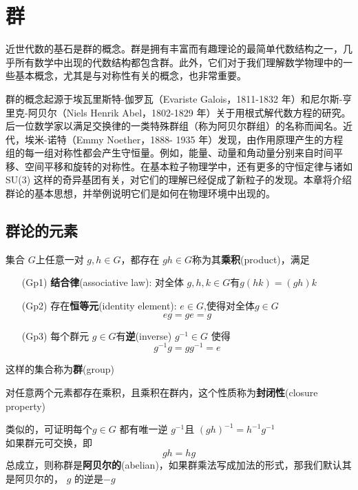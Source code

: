 \chapter{群}
近世代数的基石是群的概念。群是拥有丰富而有趣理论的最简单代数结构之一，几乎所有数学中出现的代数结构都包含群。此外，它们对于我们理解数学物理中的一些基本概念，尤其是与对称性有关的概念，也非常重要。

群的概念起源于埃瓦里斯特-伽罗瓦（Evariste Galois，1811-1832 年）和尼尔斯-亨里克-阿贝尔（Niels Henrik Abel，1802-1829 年）关于用根式解代数方程的研究。后一位数学家以满足交换律的一类特殊群组（称为阿贝尔群组）的名称而闻名。近代，埃米-诺特（Emmy Noether，1888- 1935 年）发现，由作用原理产生的方程组的每一组对称性都会产生守恒量。例如，能量、动量和角动量分别来自时间平移、空间平移和旋转的对称性。在基本粒子物理学中，还有更多的守恒定律与诸如 SU(3) 这样的奇异基团有关，对它们的理解已经促成了新粒子的发现。本章将介绍群论的基本思想，并举例说明它们是如何在物理环境中出现的。
\section{群论的元素}\label{sec:2.1}
集合 $G$上任意一对 $g,h\in G$，都存在 $gh\in G$称为其\textbf{乘积}(product)，满足
\begin{enumerate}
    \item[(Gp1)]\label{gp:1}
    \textbf{结合律}(associative law): 对全体 $g,h,k\in G$有$g(hk)=(gh)k$  
    \item[(Gp2)] \label{gp:2}
    存在\textbf{恒等元}(identity element): $e\in G$,使得对全体\(g\in G\)
    \[eg=ge=g\]
    \item[(Gp3)] \label{gp:3}
    每个群元 $g\in G$有\textbf{逆}(inverse) $g^{-1}\in G$ 使得\[g^{-1}g=gg^{-1}=e\] 
\end{enumerate}
这样的集合称为\textbf{群}(group)

对任意两个元素都存在乘积，且乘积在群内，这个性质称为\textbf{封闭性}(closure property)

类似的，可证明每个$g\in G$ 都有唯一逆 $g^{-1}$且 $(gh)^{-1}=h^{-1}g^{-1}$ 
\\
如果群元可交换，即\[gh=hg\]总成立，则称群是\textbf{阿贝尔的}(abelian)，如果群乘法写成加法的形式，那我们默认其是阿贝尔的， $g$ 的逆是$-g$ 

